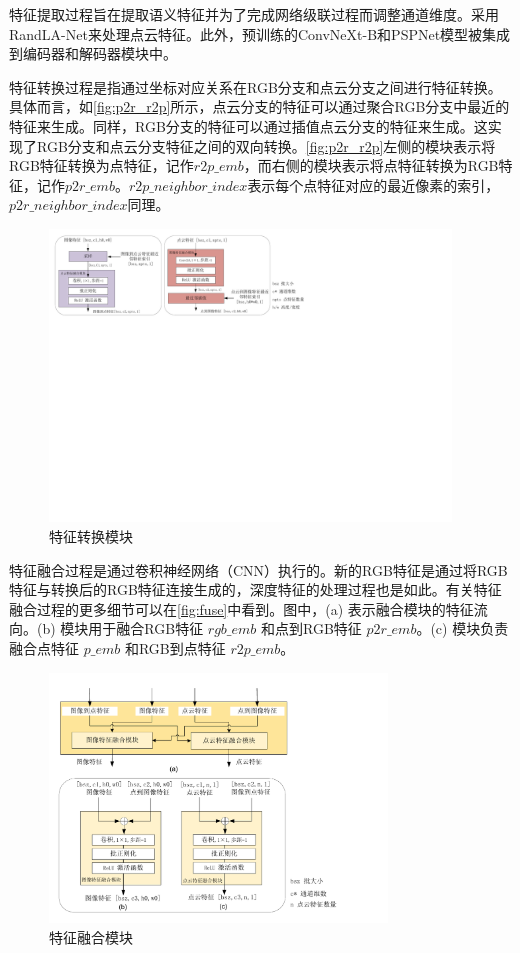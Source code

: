 特征提取过程旨在提取语义特征并为了完成网络级联过程而调整通道维度。采用RandLA-Net\cite{hu2020randla}来处理点云特征。此外，预训练的ConvNeXt-B\cite{Liu2022ACF}和PSPNet\cite{zhao2017pyramid}模型被集成到编码器和解码器模块中。

特征转换过程是指通过坐标对应关系在RGB分支和点云分支之间进行特征转换。具体而言，如\autoref{fig:p2r_r2p}所示，点云分支的特征可以通过聚合RGB分支中最近的特征来生成。同样，RGB分支的特征可以通过插值点云分支的特征来生成。这实现了RGB分支和点云分支特征之间的双向转换。\autoref{fig:p2r_r2p}左侧的模块表示将RGB特征转换为点特征，记作$r2p\_emb$，而右侧的模块表示将点特征转换为RGB特征，记作$p2r\_emb$。$r2p\_neighbor\_index$表示每个点特征对应的最近像素的索引，$p2r\_neighbor\_index$同理。

\begin{figure}[htbp]
    \centering
    \includegraphics[width=0.95\textwidth]{figure/hipose/p2r_r2p.pdf}
    \caption{特征转换模块}
    \label{fig:p2r_r2p}
\end{figure}

特征融合过程是通过卷积神经网络（CNN）执行的。新的RGB特征是通过将RGB特征与转换后的RGB特征连接生成的，深度特征的处理过程也是如此。有关特征融合过程的更多细节可以在\autoref{fig:fuse}中看到。图中，(a) 表示融合模块的特征流向。(b) 模块用于融合RGB特征 $rgb\_emb$ 和点到RGB特征 $p2r\_emb$。(c) 模块负责融合点特征 $p\_emb$ 和RGB到点特征 $r2p\_emb$。

\begin{figure}[htbp]
    \centering
    \includegraphics[width=0.8\textwidth]{figure/hipose/fuse.pdf}
    \caption{特征融合模块}
    \label{fig:fuse}
\end{figure}


